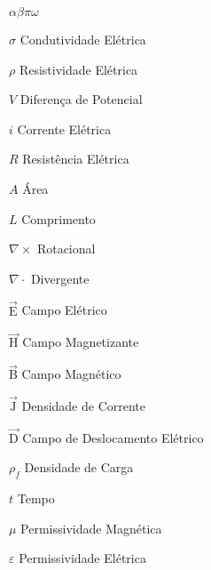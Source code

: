 \documentclass[csgeo,tcc]{unipampa}
\newcommand{\ven}[1]{\vec{\textrm{#1}}}                                         %
\begin{document}
\begin{listofsymbols}{$\alpha\beta\pi\omega$}
       \item[$\sigma$]                  Condutividade Elétrica
       \item[$\rho$]                    Resistividade Elétrica
       \item[$V$]                       Diferença de Potencial
       \item[$i$]                       Corrente Elétrica
       \item[$R$]                       Resistência Elétrica
       \item[$A$]                       Área
       \item[$L$]                       Comprimento
       \item[$\nabla \times$]           Rotacional
       \item[$\nabla \cdot$]            Divergente
       \item[$\ven{E}$]                 Campo Elétrico
       \item[$\ven{H}$]                 Campo Magnetizante
       \item[$\ven{B}$]                 Campo Magnético
       \item[$\ven{J}$]                 Densidade de Corrente
       \item[$\ven{D}$]                 Campo de Deslocamento Elétrico
       \item[$\rho_f$]                  Densidade de Carga
       \item[$t$]                       Tempo
       \item[$\mu$]                     Permissividade Magnética
       \item[$\varepsilon$]             Permissividade Elétrica
       
       
\end{listofsymbols}







\tableofcontents
\end{document}
